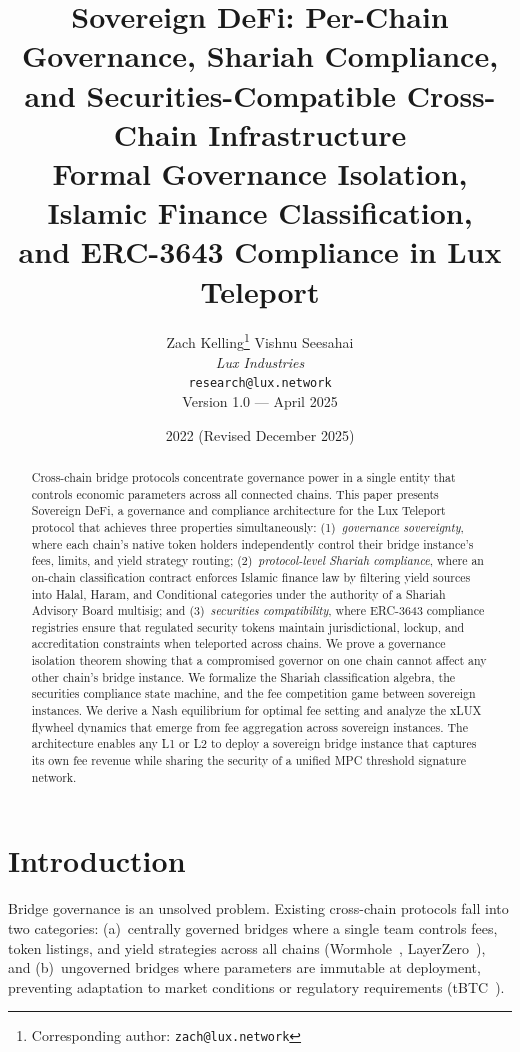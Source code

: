 \documentclass[11pt,twocolumn]{article}
\title{
  \textbf{Sovereign DeFi: Per-Chain Governance, Shariah Compliance,\\
  and Securities-Compatible Cross-Chain Infrastructure} \\[6pt]
  \large Formal Governance Isolation, Islamic Finance Classification,\\
  and ERC-3643 Compliance in Lux Teleport
}
\author{
  Zach Kelling\thanks{Corresponding author: \texttt{zach@lux.network}} \quad
  Vishnu Seesahai \\
  \textit{Lux Industries} \\
  \texttt{research@lux.network} \\[4pt]
  \small Version 1.0 --- April 2025
}
\date{2022 (Revised December 2025)}
\theoremstyle{definition}
\begin{document}
\luxcoverpage
\maketitle

\begin{abstract}
Cross-chain bridge protocols concentrate governance power in a single entity that controls economic parameters across all connected chains. This paper presents Sovereign DeFi, a governance and compliance architecture for the Lux Teleport protocol that achieves three properties simultaneously: (1)~\emph{governance sovereignty}, where each chain's native token holders independently control their bridge instance's fees, limits, and yield strategy routing; (2)~\emph{protocol-level Shariah compliance}, where an on-chain classification contract enforces Islamic finance law by filtering yield sources into Halal, Haram, and Conditional categories under the authority of a Shariah Advisory Board multisig; and (3)~\emph{securities compatibility}, where ERC-3643 compliance registries ensure that regulated security tokens maintain jurisdictional, lockup, and accreditation constraints when teleported across chains. We prove a governance isolation theorem showing that a compromised governor on one chain cannot affect any other chain's bridge instance. We formalize the Shariah classification algebra, the securities compliance state machine, and the fee competition game between sovereign instances. We derive a Nash equilibrium for optimal fee setting and analyze the xLUX flywheel dynamics that emerge from fee aggregation across sovereign instances. The architecture enables any L1 or L2 to deploy a sovereign bridge instance that captures its own fee revenue while sharing the security of a unified MPC threshold signature network.
\end{abstract}

\section{Introduction}
\label{sec:intro}

Bridge governance is an unsolved problem. Existing cross-chain protocols fall into two categories: (a)~centrally governed bridges where a single team controls fees, token listings, and yield strategies across all chains (Wormhole~\cite{wormhole}, LayerZero~\cite{layerzero}), and (b)~ungoverned bridges where parameters are immutable at deployment, preventing adaptation to market conditions or regulatory requirements (tBTC~\cite{tbtc}).
\end{document}
